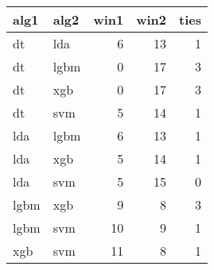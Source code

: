 \begin{tabular}{llrrr}
  \toprule
{\bfseries alg1} & {\bfseries alg2} & {\bfseries win1} & {\bfseries win2} & {\bfseries ties} \\ 
  \midrule
dt & lda & 6 & 13 & 1 \\ 
  dt & lgbm & 0 & 17 & 3 \\ 
  dt & xgb & 0 & 17 & 3 \\ 
  dt & svm & 5 & 14 & 1 \\ 
  lda & lgbm & 6 & 13 & 1 \\ 
  lda & xgb & 5 & 14 & 1 \\ 
  lda & svm & 5 & 15 & 0 \\ 
  lgbm & xgb & 9 & 8 & 3 \\ 
  lgbm & svm & 10 & 9 & 1 \\ 
  xgb & svm & 11 & 8 & 1 \\ 
   \bottomrule
\end{tabular}
